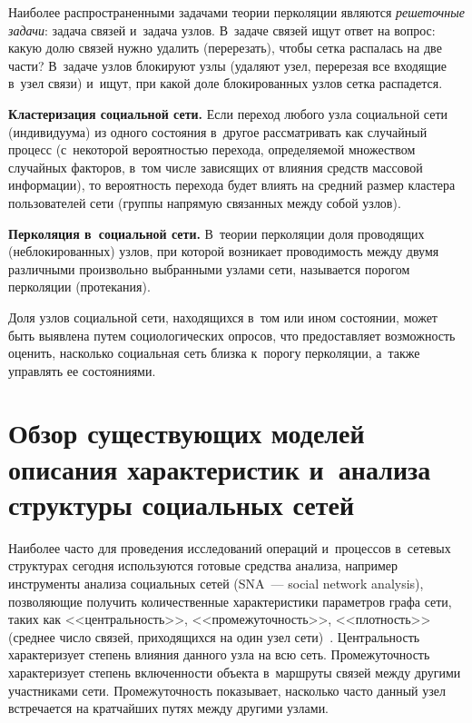 \begin{multicols}{2}
  Наиболее распространенными задачами тео\-рии перколяции являются 
\textit{решеточные задачи}: задача связей и~задача узлов. В~задаче связей ищут 
ответ на вопрос: какую долю связей нужно удалить (перерезать), чтобы сетка 
рас\-па\-лась на две части? В~задаче узлов блокируют узлы (удаляют узел, 
перерезая все входящие в~узел связи) и~ищут, при какой доле блокированных 
узлов сетка рас\-па\-дется. 
  
  \textbf{Кластеризация социальной сети.} Если переход любого узла 
социальной сети (индивидуума) из одно\-го со\-сто\-яния в~другое рас\-смат\-ри\-вать 
как случайный процесс (с~некоторой вероятностью перехода, определяемой 
множеством случайных факторов, в~том чис\-ле зависящих от вли\-яния средств 
массовой информации), то ве\-ро\-ят\-ность перехода будет влиять на средний 
размер клас\-те\-ра пользователей сети (группы на\-пря\-мую связанных меж\-ду собой 
узлов). 
  
  \textbf{Перколяция в~социальной сети.} В~тео\-рии пер\-ко\-ля\-ции доля 
проводящих (неблокированных) узлов, при которой возникает про\-во\-ди\-мость 
между двумя различными произвольно вы\-бран\-ны\-ми узлами сети, называется 
порогом пер\-ко\-ля\-ции (протекания). 
  
  Доля узлов социальной сети, находящихся в~том или ином со\-сто\-янии, может 
быть выявлена путем социологических опро\-сов, что пред\-остав\-ля\-ет 
воз\-мож\-ность оценить, насколько социальная сеть близка к~порогу пер\-ко\-ля\-ции, 
а~так\-же управ\-лять ее со\-сто\-яни\-ями.

\vspace*{-6pt}
  
\section{Обзор существующих моделей описания характеристик 
и~анализа структуры социальных сетей}
 
  Наиболее часто для проведения исследований операций и~процессов 
в~сетевых структурах сегодня используются готовые средства анализа, 
например инструменты анализа социальных сетей (SNA~--- social network 
analysis), позволяющие получить количественные характеристики па\-ра\-мет\-ров 
графа сети, таких как <<цент\-раль\-ность>>, <<про\-ме\-жу\-точ\-ность>>,  
<<плот\-ность>> (сред\-нее чис\-ло связей, приходящихся на один узел 
сети)~\cite{7-zh}. Цент\-раль\-ность характеризует степень влияния данного узла 
на всю сеть. Про\-ме\-жу\-точ\-ность характеризует степень включенности объекта 
в~марш\-ру\-ты связей между другими участниками сети. Про\-ме\-жу\-точ\-ность 
показывает, насколько час\-то данный узел встречается на кратчайших путях 
меж\-ду другими узлами. 
  

\end{multicols}
